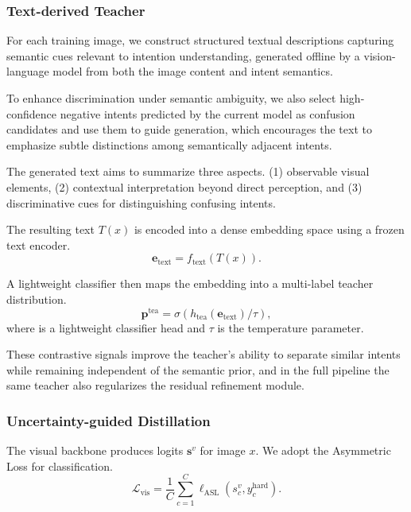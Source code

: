 \subsubsection{Text-derived Teacher}

For each training image, we construct structured textual descriptions capturing semantic cues relevant to intention understanding, generated offline by a vision-language model from both the image content and intent semantics.

To enhance discrimination under semantic ambiguity, we also select high-confidence negative intents predicted by the current model as confusion candidates and use them to guide generation, which encourages the text to emphasize subtle distinctions among semantically adjacent intents.

The generated text aims to summarize three aspects.
(1) observable visual elements,
(2) contextual interpretation beyond direct perception, and
(3) discriminative cues for distinguishing confusing intents.

The resulting text $T(x)$ is encoded into a dense embedding space using a frozen text encoder.
\begin{equation}
\mathbf{e}_{\text{text}} = f_{\text{text}}(T(x)).
\end{equation}

A lightweight classifier then maps the embedding into a multi-label teacher distribution.
\begin{equation}
\mathbf{p}^{\text{tea}} = \sigma(h_{\text{tea}}(\mathbf{e}_{\text{text}}) / \tau),
\end{equation}
where  is a lightweight classifier head and $\tau$ is the temperature parameter.

These contrastive signals improve the teacher's ability to separate similar intents while remaining independent of the semantic prior, and in the full pipeline the same teacher also regularizes the residual refinement module.

\subsubsection{Uncertainty-guided Distillation}

The visual backbone produces logits $\mathbf{s}^{v}$ for image $x$. We adopt the Asymmetric Loss \cite{ridnik_asymmetric_2021} for classification.
\begin{equation}
\mathcal{L}_{\text{vis}} = \frac{1}{C} \sum_{c=1}^{C} \ell_{\text{ASL}}(s^{v}_{c}, y^{\text{hard}}_{c}).
\end{equation}

